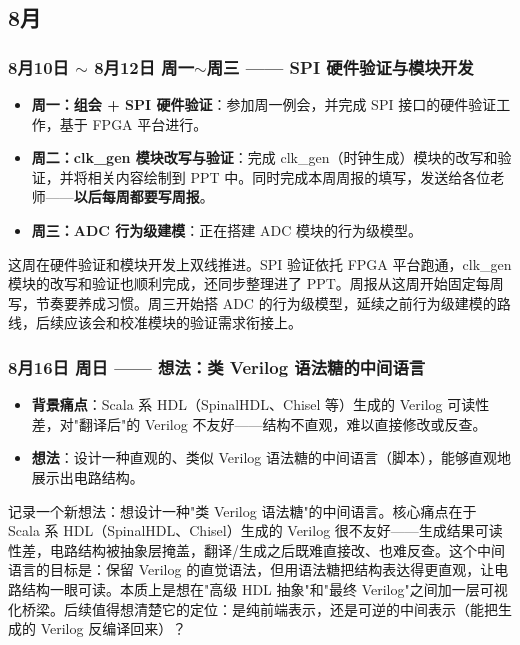 \subsection{8月}

\subsubsection{8月10日 $\sim$ 8月12日 周一$\sim$周三 —— SPI 硬件验证与模块开发}

\begin{itemize}
  \item \textbf{周一：组会 + SPI 硬件验证}：参加周一例会，并完成 SPI 接口的硬件验证工作，基于 FPGA 平台进行。
  \item \textbf{周二：clk\_gen 模块改写与验证}：完成 clk\_gen（时钟生成）模块的改写和验证，并将相关内容绘制到 PPT 中。同时完成本周周报的填写，发送给各位老师——\textbf{以后每周都要写周报}。
  \item \textbf{周三：ADC 行为级建模}：正在搭建 ADC 模块的行为级模型。
\end{itemize}

\begin{personalnote}
这周在硬件验证和模块开发上双线推进。SPI 验证依托 FPGA 平台跑通，clk\_gen 模块的改写和验证也顺利完成，还同步整理进了 PPT。周报从这周开始固定每周写，节奏要养成习惯。周三开始搭 ADC 的行为级模型，延续之前行为级建模的路线，后续应该会和校准模块的验证需求衔接上。
\end{personalnote}

\subsubsection{8月16日 周日 —— 想法：类 Verilog 语法糖的中间语言}

\begin{itemize}
  \item \textbf{背景痛点}：Scala 系 HDL（SpinalHDL、Chisel 等）生成的 Verilog 可读性差，对"翻译后"的 Verilog 不友好——结构不直观，难以直接修改或反查。
  \item \textbf{想法}：设计一种直观的、类似 Verilog 语法糖的中间语言（脚本），能够直观地展示出电路结构。
\end{itemize}

\begin{personalnote}
记录一个新想法：想设计一种"类 Verilog 语法糖"的中间语言。核心痛点在于 Scala 系 HDL（SpinalHDL、Chisel）生成的 Verilog 很不友好——生成结果可读性差，电路结构被抽象层掩盖，翻译/生成之后既难直接改、也难反查。这个中间语言的目标是：保留 Verilog 的直觉语法，但用语法糖把结构表达得更直观，让电路结构一眼可读。本质上是想在"高级 HDL 抽象"和"最终 Verilog"之间加一层可视化桥梁。后续值得想清楚它的定位：是纯前端表示，还是可逆的中间表示（能把生成的 Verilog 反编译回来）？
\end{personalnote}

